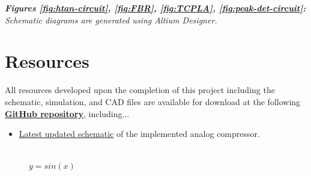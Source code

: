 \documentclass[10pt]{article}
\begin{document}
\begin{multicols*}{2}
{                \noindent\textit{\textbf{Figures \ref{fig:htan-circuit}, \ref{fig:FBR}, \ref{fig:TCPLA}, \ref{fig:peak-det-circuit}:} Schematic diagrams are generated using Altium Designer.}\\
            }

        \section*{Resources}
            All resources developed upon the completion of this project including the schematic, simulation, and CAD files are available for download at the following \textbf{\textcolor{github-butterfly-bush}{\href{https://github.com/ShaunG-RU/DRC-Project}{GitHub repository}}}, including...
            
            \begin{itemize}
                \item \href{https://github.com/ShaunG-RU/DRC-Project/blob/main/Altium/DRC.pdf}{Latest updated schematic} of the implemented analog compressor.
            \end{itemize}

        \printbibliography

        

        \iffalse
        \begin{figure}[!th]

            \centering

            \begin{minipage}[b]{0.2\linewidth}
                \centering
                \\
                \footnotesize{$y=sin(x)$}
            \end{minipage}\hfill


\end{figure}
\end{multicols*}
\end{document}
